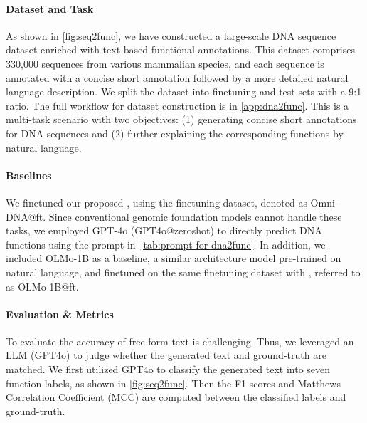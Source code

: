 \paragraph{Dataset and Task} As shown in \cref{fig:seq2func}, we have constructed a large-scale DNA sequence dataset enriched with text-based functional annotations. 
This dataset comprises 330,000 sequences from various mammalian species, and
each sequence is annotated with a concise short annotation followed by a more detailed natural language description. 
We split the dataset into finetuning and test sets with a 9:1 ratio.
The full workflow for dataset construction is in \cref{app:dna2func}. 
This is a multi-task scenario with two objectives: (1) generating concise short annotations for DNA sequences and (2) further explaining the corresponding functions by natural language.


\paragraph{Baselines} We finetuned our proposed \method, using the finetuning dataset, denoted as Omni-DNA@ft. 
Since conventional genomic foundation models cannot handle these tasks, we employed GPT-4o (GPT4o@zeroshot) to directly predict DNA functions using the prompt in~\cref{tab:prompt-for-dna2func}.
In addition, we included OLMo-1B as a baseline, a similar architecture model pre-trained on natural language, and finetuned on the same finetuning dataset with \method, referred to as OLMo-1B@ft.


\paragraph{Evaluation \& Metrics} To evaluate the accuracy of free-form text is challenging. Thus, we leveraged an LLM (GPT4o) to judge whether the generated text and ground-truth are matched. We first utilized GPT4o to
classify the generated text into seven function labels, as shown in \cref{fig:seq2func}. Then the F1 scores and Matthews Correlation Coefficient (MCC) are computed between the classified labels and ground-truth.




